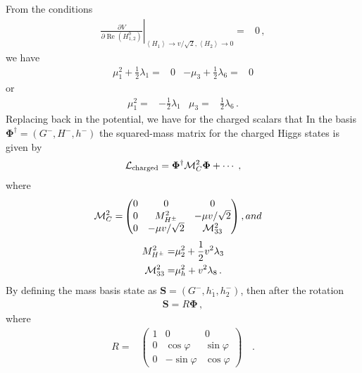 From the conditions
\begin{align}
  \left.   \frac{\partial V}{\partial \operatorname{Re}\left( H_{1,2}^{0} \right)} \right|_{\left\langle H_1  \right\rangle \to v/\sqrt{2},\left\langle H_2  \right\rangle \to 0}=&0\,,
\end{align}
we have
\begin{align}
  \mu_1^2+\frac{1}{2} \lambda_1 =&0 &-\mu_3+\frac{1}{2}\lambda_6=&0
\end{align}
or
\begin{align}
   \mu_1^2=&-\frac{1}{2} \lambda_1  &\mu_3=&\frac{1}{2}\lambda_6\,.
\end{align}
Replacing back in the potential, we have for the charged scalars that
In the basis $\mathbf{\Phi}^{\dagger}=(G^{-}, 
H^{-}, h^{-})$ 
the squared-mass matrix for the charged Higgs states is given by
\begin{align}
  \label{eq:scalarM}
\mathcal{L}_{\text{charged}}= \boldsymbol{\Phi}^{\dagger} {\cal M}_{C}^{2}\boldsymbol{\Phi}+\cdots\;,
\end{align}
where 
\begin{align}
  {\cal M}_{C}^{2}=&
  \begin{pmatrix}
    0   &          0         &  0                   \\
    0   &  M_{H^{\pm}}^{2}   &  -\mu v/\sqrt{2}     \\
    0       &  -\mu v/\sqrt{2} &  {\cal M}_{33}^{2}   
  \end{pmatrix},
and
\end{align}
\begin{align}
  \label{eq:entriesofmassmatrix}
  M_{H^{\pm}}^{2} =& \mu_{2}^{2} +\frac{1}{2}v^{2}\lambda_{3}
  \nonumber\\
  {\cal M}_{33}^{2} =& \mu_{h}^{2} + v^{2}\lambda_{8}\,.
\end{align}
By defining the mass basis state as $\mathbf{S}=\left( G^-,h_1^.,h_2^- \right)$, then after the rotation
\begin{align}
\mathbf{S}=R \boldsymbol{\Phi}\,,
\end{align}
where
\begin{align}
    \label{eq:rotationM}
  R =& 
  \begin{pmatrix}
    1 &      0       &     0       \\
    0 & \cos\varphi  &  \sin\varphi\\
    0 & -\sin\varphi &  \cos\varphi
  \end{pmatrix}&\,.
\end{align}
